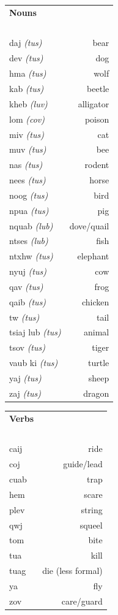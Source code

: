 \documentclass{article}
\begin{document}
\clearpage

\begin{multicols}{2}
[
\section*{}
]

\begin{tabular}{l r}
\textbf{Nouns} \\
~\\
daj {\em (tus)} &bear\\
dev {\em (tus)} &dog\\
hma {\em (tus)} &wolf\\
kab {\em (tus)} &beetle\\
kheb {\em (luv)} &alligator\\
lom {\em (cov)} &poison\\
miv {\em (tus)} &cat\\
muv {\em (tus)} &bee\\
nas {\em (tus)} &rodent\\
nees {\em (tus)} &horse\\
noog {\em (tus)} &bird\\
npua {\em (tus)} &pig\\
nquab {\em (lub)} &dove/quail\\
ntses {\em (lub)} &fish\\
ntxhw {\em (tus)} &elephant\\
nyuj {\em (tus)} &cow\\
qav {\em (tus)} &frog\\
qaib {\em (tus)} &chicken\\
tw {\em (tus)} &tail\\
tsiaj lub {\em (tus)} &animal\\
tsov {\em (tus)} &tiger\\
vaub ki {\em (tus)} &turtle\\
yaj {\em (tus)} &sheep\\
zaj {\em (tus)} &dragon\\
\end{tabular}

\begin{tabular}{l r}
\textbf{Verbs} \\
~\\
caij &ride\\
coj &guide/lead\\
cuab &trap\\
hem &scare\\
plev &string\\
qwj &squeel\\
tom &bite\\
tua &kill\\
tuag &die (less formal)\\
ya &fly\\
zov &care/guard\\
\end{tabular}
\end{multicols}
\end{document}
